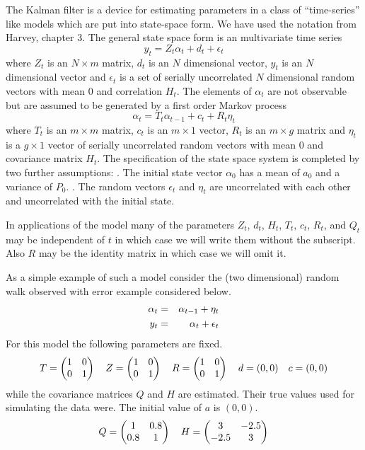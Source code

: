 %
%
%
\def\aone{a_{t|t-1}}
\def\Pone{P_{t|t-1}}

The Kalman filter is a device for estimating parameters in
a class of ``time-series'' like models which are put into state-space
form. We have used the 
notation from Harvey, chapter 3.
The general state space form is an  multivariate time series
$$y_t=Z_t\alpha_t+d_t+\epsilon_t$$ 
where $Z_t$ is an $N\times m$ matrix, $d_t$ is an $N$ dimensional
vector, $y_t$ is an $N$ dimensional vector and $\epsilon_t$ is
a set of serially uncorrelated $N$ dimensional random vectors 
with mean $0$ and correlation $H_t$.
The elements of $\alpha_t$ are not observable but are
assumed to be generated by a first order Markov process
$$\alpha_t=T_t\alpha_{t-1}+c_t+R_t\eta_t$$
where $T_t$ is an $m\times m$ matrix, $c_t$ is an $m\times 1$
vector, $R_t$ is an $m\times g$ matrix and $\eta_t$
is a $g\times 1$ vector of serially uncorrelated 
random vectors with mean $0$ and covariance matrix $H_t$.
The specification of the state space system is completed by
two further assumptions:
. The initial state vector $\alpha_0$ has a mean of $a_0$ and a 
variance of $P_0$.
. The random vectors $\epsilon_t$ and $\eta_t$ are uncorrelated
with each other and uncorrelated with the initial state.

In applications of the model many of the
parameters $Z_t$, $d_t$, $H_t$, $T_t$, $c_t$, $R_t$, and $Q_t$
may be independent of $t$ in which case we will write them
without the subscript. Also $R$ may be the identity matrix
in which case we will omit it.

As a simple example of such a model consider the (two dimensional)
random walk observed with error example considered below.
 \begin{eqnarray}
   \alpha_t&=&\alpha_{t-1}+\eta_t\cr
   y_t&=&\alpha_t+\epsilon_t\cr
 \end{eqnarray}
For this model  the following parameters are fixed.
$$ T=\left(\begin{matrix}1 & 0\\
                    0 & 1 \end{matrix}\right) 
  \quad
   Z=\left(\begin{matrix}1 & 0\cr
                    0 & 1 \end{matrix}\right) 
  \quad
   R=\left(\begin{matrix}1 & 0\cr
                    0 & 1\end{matrix}\right) 
  \quad
  d=(0,0)
  \quad
  c=(0,0)
$$
while the covariance matrices $Q$ and $H$ are estimated. Their
true values used for simulating the data were. The initial
value of $a$ is $(0,0)$.
$$
   Q=\left(\begin{matrix}1 & 0.8\cr
                   0.8 & 1 \end{matrix}\right)
  \quad
   H=\left(\begin{matrix}3 & -2.5\cr
                   -2.5 & 3 \end{matrix}\right)
$$
 
